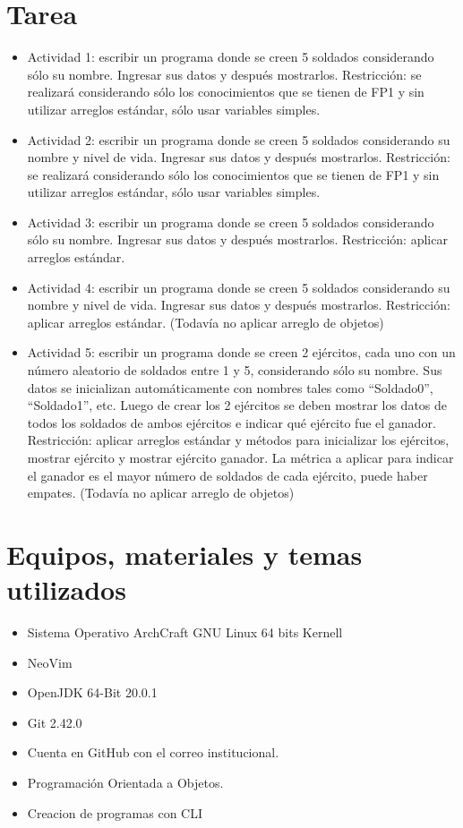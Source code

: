 \documentclass{article}
\begin{document}
	\section{Tarea}
	\begin{itemize}		
		\item Actividad 1: escribir un programa donde se creen 5 soldados considerando sólo su nombre. Ingresar sus datos y
después mostrarlos.
Restricción: se realizará considerando sólo los conocimientos que se tienen de FP1 y sin utilizar arreglos estándar,
sólo usar variables simples.
		\item Actividad 2: escribir un programa donde se creen 5 soldados considerando su nombre y nivel de vida. Ingresar sus
datos y después mostrarlos.
Restricción: se realizará considerando sólo los conocimientos que se tienen de FP1 y sin utilizar arreglos estándar,
sólo usar variables simples.
		\item Actividad 3: escribir un programa donde se creen 5 soldados considerando sólo su nombre. Ingresar sus datos y
después mostrarlos.
Restricción: aplicar arreglos estándar.
            \item Actividad 4: escribir un programa donde se creen 5 soldados considerando su nombre y nivel de vida. Ingresar sus
datos y después mostrarlos.
Restricción: aplicar arreglos estándar. (Todavía no aplicar arreglo de objetos)
            \item Actividad 5: escribir un programa donde se creen 2 ejércitos, cada uno con un número aleatorio de soldados entre
1 y 5, considerando sólo su nombre. Sus datos se inicializan automáticamente con nombres tales como “Soldado0”,
“Soldado1”, etc. Luego de crear los 2 ejércitos se deben mostrar los datos de todos los soldados de ambos ejércitos
e indicar qué ejército fue el ganador.
Restricción: aplicar arreglos estándar y métodos para inicializar los ejércitos, mostrar ejército y mostrar ejército
ganador. La métrica a aplicar para indicar el ganador es el mayor número de soldados de cada ejército, puede
haber empates. (Todavía no aplicar arreglo de objetos)
	\end{itemize}
		
	\section{Equipos, materiales y temas utilizados}
	\begin{itemize}
		\item Sistema Operativo ArchCraft GNU Linux 64 bits Kernell
		\item NeoVim
		\item OpenJDK 64-Bit 20.0.1 
		\item Git 2.42.0
		\item Cuenta en GitHub con el correo institucional.
		\item Programación Orientada a Objetos.
		\item Creacion de programas con CLI	
	\end{itemize}
	
\end{document}
